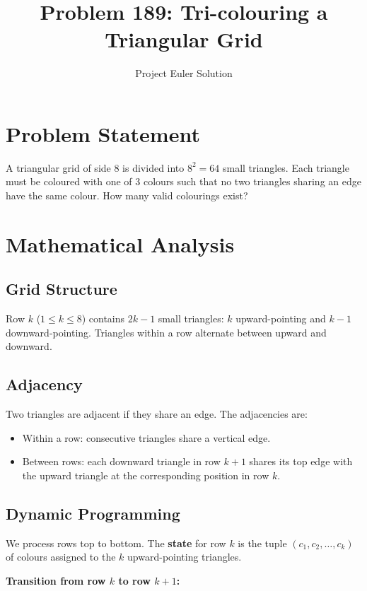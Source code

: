 \documentclass[12pt]{article}
\title{Problem 189: Tri-colouring a Triangular Grid}
\author{Project Euler Solution}
\date{}
\begin{document}
\maketitle

\section{Problem Statement}

A triangular grid of side 8 is divided into $8^2 = 64$ small triangles. Each triangle must be coloured with one of 3 colours such that no two triangles sharing an edge have the same colour. How many valid colourings exist?

\section{Mathematical Analysis}

\subsection{Grid Structure}

Row $k$ ($1 \le k \le 8$) contains $2k-1$ small triangles: $k$ upward-pointing and $k-1$ downward-pointing. Triangles within a row alternate between upward and downward.

\subsection{Adjacency}

Two triangles are adjacent if they share an edge. The adjacencies are:
\begin{itemize}
    \item Within a row: consecutive triangles share a vertical edge.
    \item Between rows: each downward triangle in row $k+1$ shares its top edge with the upward triangle at the corresponding position in row $k$.
\end{itemize}

\subsection{Dynamic Programming}

We process rows top to bottom. The \textbf{state} for row $k$ is the tuple $(c_1, c_2, \ldots, c_k)$ of colours assigned to the $k$ upward-pointing triangles.

\textbf{Transition from row $k$ to row $k+1$:}
\end{document}
